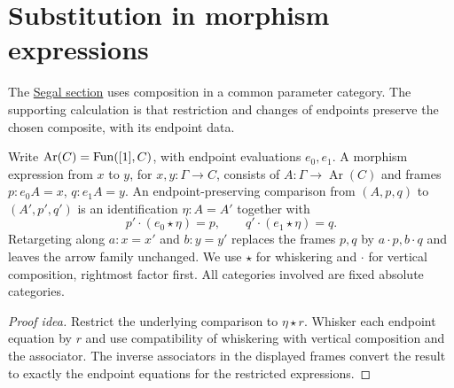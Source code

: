 \documentclass[11pt]{article}
\begin{document}
\section*{Substitution in morphism expressions}

The \href{segal-axiom.html}{Segal section} uses composition in a common
parameter category. The supporting calculation is that restriction and
changes of endpoints preserve the chosen composite, with its endpoint data.

Write $\operatorname{Ar}(C)=\operatorname{Fun}([1],C)$, with endpoint evaluations $e_0,e_1$.
A morphism expression from $x$ to $y$, for $x,y\colon\Gamma\to C$,
consists of $A\colon\Gamma\to\operatorname{Ar}(C)$ and frames
$p\colon e_0A=x$, $q\colon e_1A=y$.
An endpoint-preserving comparison from $(A,p,q)$ to $(A',p',q')$ is an
identification $\eta\colon A=A'$ together with
\[
 p'\cdot(e_0\star\eta)=p,\qquad q'\cdot(e_1\star\eta)=q.
\]
Retargeting along $a\colon x=x'$ and $b\colon y=y'$ replaces the frames
$p,q$ by $a\cdot p,b\cdot q$ and leaves the arrow family unchanged.
We use $\star$ for whiskering and $\cdot$ for vertical composition,
rightmost factor first. All categories involved are fixed absolute categories.

\begin{proof}[Proof idea]
Restrict the underlying comparison to $\eta\star r$.
Whisker each endpoint equation by $r$ and use compatibility of
whiskering with vertical composition and the associator. The inverse
associators in the displayed frames convert the result to exactly the
endpoint equations for the restricted expressions.
\end{proof}
\end{document}

